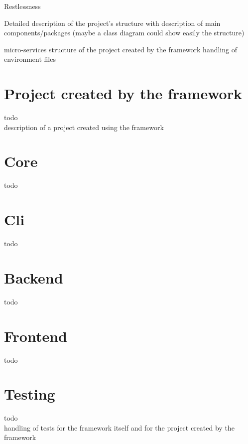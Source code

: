 \begin{chapter}{Restlessness}
    \label{chap:restlessness}

    Detailed description of the project's structure with description of main components/packages
    (maybe a class diagram could show easily the structure)

    micro-services structure of the project created by the framework
    handling of environment files

    \section{Project created by the framework}
    todo\\
    description of a project created using the framework

    \section{Core}
    todo

    \section{Cli}
    todo

    \section{Backend}
    todo

    \section{Frontend}
    todo

    \section{Testing}
    todo\\
    handling of tests for the framework itself and for the project created by the
    framework

\end{chapter}